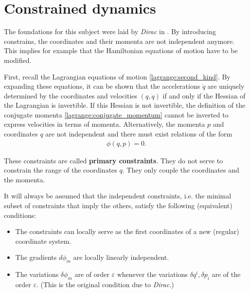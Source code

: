\section{Constrained dynamics}\label{section:constrained_dynamics}

    The foundations for this subject were laid by \textit{Dirac} in \cite{constrained}. By introducing constrains, the coordinates and their momenta are not independent anymore. This implies for example that the Hamiltonian equations of motion have to be modified.

    First, recall the Lagrangian equations of motion \ref{lagrange:second_kind}. By expanding these equations, it can be shown that the accelerations $\ddot{q}$ are uniquely determined by the coordinates and velocities $(q,\dot{q})$ if and only if the Hessian of the Lagrangian is invertible. If this Hessian is not invertible, the definition of the conjugate momenta \ref{lagrange:conjugate_momentum} cannot be inverted to express velocities in terms of momenta. Alternatively, the momenta $p$ and coordinates $q$ are not independent and there must exist relations of the form
    \begin{gather}
        \phi(q,p) = 0.
    \end{gather}

    \begin{remark}
        These constraints are called \textbf{primary constraints}. They do not serve to constrain the range of the coordinates $q$. They only couple the coordinates and the momenta.
    \end{remark}
    \begin{axiom}
        It will always be assumed that the independent constraints, i.e. the minimal subset of constraints that imply the others, satisfy the following (equivalent) conditions:
        \begin{itemize}
            \item The constraints can locally serve as the first coordinates of a new (regular) coordinate system.
            \item The gradients $d\phi_m$ are locally linearly independent.
            \item The variations $\delta\phi_m$ are of order $\varepsilon$ whenever the variations $\delta q^i,\delta p_i$ are of the order $\varepsilon$. (This is the original condition due to \textit{Dirac}.)
        \end{itemize}
    \end{axiom}

